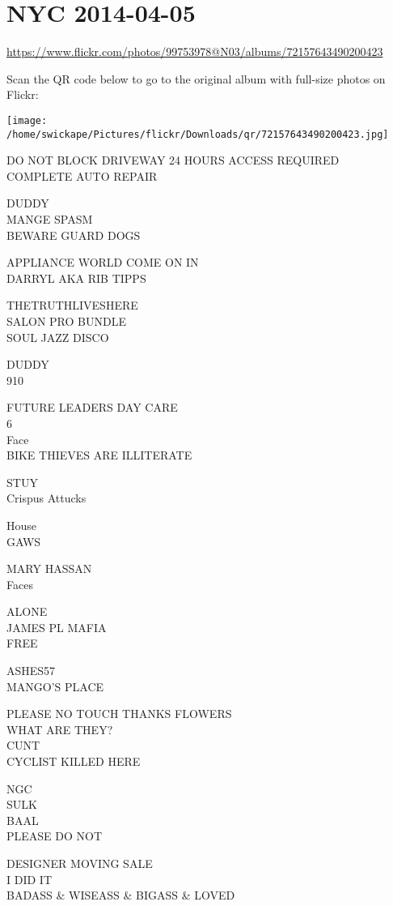 \documentclass[10pt,letterpaper]{article}
\begin{document}
\section*{NYC 2014-04-05}

\url{https://www.flickr.com/photos/99753978@N03/albums/72157643490200423}

Scan the QR code below to go to the original album with full-size photos on Flickr:

\texttt{[image: /home/swickape/Pictures/flickr/Downloads/qr/72157643490200423.jpg]}
\pagebreak

DO NOT BLOCK DRIVEWAY 24 HOURS ACCESS REQUIRED\\
COMPLETE AUTO REPAIR

DUDDY\\
MANGE SPASM\\
BEWARE GUARD DOGS

APPLIANCE WORLD COME ON IN\\
DARRYL AKA RIB TIPPS

THETRUTHLIVESHERE\\
SALON PRO BUNDLE\\
SOUL JAZZ DISCO

DUDDY\\
910

FUTURE LEADERS DAY CARE\\
6\\
Face\\
BIKE THIEVES ARE ILLITERATE

STUY\\
Crispus Attucks

House\\
GAWS

MARY HASSAN\\
Faces

ALONE\\
JAMES PL MAFIA\\
FREE

ASHES57\\
MANGO'S PLACE

PLEASE NO TOUCH THANKS FLOWERS\\
WHAT ARE THEY?\\
CUNT\\
CYCLIST KILLED HERE

NGC\\
SULK\\
BAAL\\
PLEASE DO NOT

DESIGNER MOVING SALE\\
I DID IT\\
BADASS \& WISEASS \& BIGASS \& LOVED
\end{document}
